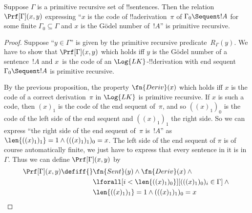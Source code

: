 \documentclass[../../../include/open-logic-section]{subfiles}
\begin{document}
\begin{prop}
Suppose $\Gamma$ is a primitive recursive set of !!{sentence}s.  Then
the relation $\Prf[\Gamma](x, y)$ expressing ``$x$ is the code of
!!a{derivation}~$\pi$ of $\Gamma_0 \Sequent !A$ for some finite
$\Gamma_0 \subseteq \Gamma$ and $x$ is the G\"odel number of~$!A$'' is
primitive recursive.
\end{prop}

\begin{proof}
Suppose ``$y \in \Gamma$'' is given by the primitive recursive
predicate~$R_\Gamma(y)$.  We have to show that $\Prf[\Gamma](x, y)$
which holds iff $y$ is the G\"odel number of a sentence~$!A$ and
$x$~is the code of an $\Log{LK}$-!!{derivation} with end sequent
$\Gamma_0 \Sequent !A$ is primitive recursive.

By the previous proposition, the property $\fn{Deriv}(x)$ which holds
iff $x$ is the code of a correct derivation~$\pi$ in $\Log{LK}$ is
primitive recursive.  If $x$ is such a code, then $(x)_1$ is the code
of the end sequent of~$\pi$, and so $((x)_1)_0$ is the code of the
left side of the end sequent and $((x)_1)_1$ the right side.  So we can
express ``the right side of the end sequent of~$\pi$ is~$!A$'' as
$\len{((x)_1)_1} = 1 \land (((x)_1)_1)_0 = x$.  The left side of the
end sequent of $\pi$ is of course automatically finite, we just have
to express that every sentence in it is in~$\Gamma$.  Thus we can
define $\Prf[\Gamma](x, y)$ by
\begin{align*}
\Prf[\Gamma](x, y) \defiff {}&
\fn{Sent}(y) \land \fn{Deriv}(x) \land {} \\
& \lforall[i <
  \len{((x)_1)_0}][(((x)_1)_0)_i \in \Gamma] \land {}\\
& \len{((x)_1)_1} = 1 \land (((x)_1)_1)_0 = x
\end{align*}
\end{proof}
\end{document}
